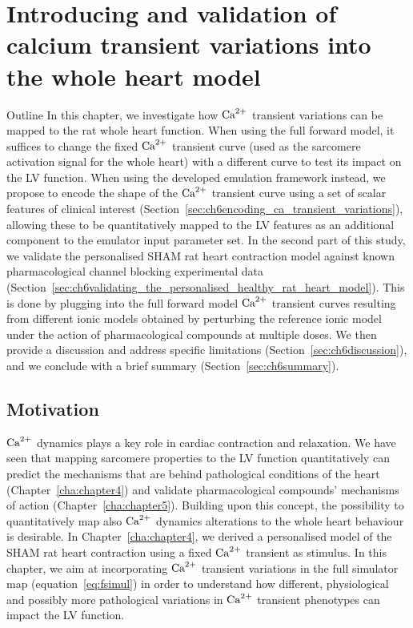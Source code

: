 \chapter{Introducing and validation of calcium transient variations into the whole heart model}\label{cha:chapter6}
%
%
%
\begin{remark}{Outline}
    In this chapter, we investigate how $\textrm{Ca}^{2+}$ transient variations can be mapped to the rat whole heart function. When using the full forward model, it suffices to change the fixed $\textrm{Ca}^{2+}$ transient curve (used as the sarcomere activation signal for the whole heart) with a different curve to test its impact on the LV function. When using the developed emulation framework instead, we propose to encode the shape of the $\textrm{Ca}^{2+}$ transient curve using a set of scalar features of clinical interest (Section~\ref{sec:ch6encoding_ca_transient_variations}), allowing these to be quantitatively mapped to the LV features as an additional component to the emulator input parameter set. In the second part of this study, we validate the personalised SHAM rat heart contraction model against known pharmacological channel blocking experimental data (Section~\ref{sec:ch6validating_the_personalised_healthy_rat_heart_model}). This is done by plugging into the full forward model $\textrm{Ca}^{2+}$ transient curves resulting from different ionic models obtained by perturbing the reference ionic model under the action of pharmacological compounds at multiple doses. We then provide a discussion and address specific limitations (Section~\ref{sec:ch6discussion}), and we conclude with a brief summary (Section~\ref{sec:ch6summary}).
\end{remark}


%
%
%
\section{Motivation}\label{sec:ch6motivation}
$\textrm{Ca}^{2+}$ dynamics plays a key role in cardiac contraction and relaxation. We have seen that mapping sarcomere properties to the LV function quantitatively can predict the mechanisms that are behind pathological conditions of the heart (Chapter~\ref{cha:chapter4}) and validate pharmacological compounds' mechanisms of action (Chapter~\ref{cha:chapter5}). Building upon this concept, the possibility to quantitatively map also $\textrm{Ca}^{2+}$ dynamics alterations to the whole heart behaviour is desirable. In Chapter~\ref{cha:chapter4}, we derived a personalised model of the SHAM rat heart contraction using a fixed $\textrm{Ca}^{2+}$ transient as stimulus. In this chapter, we aim at incorporating $\textrm{Ca}^{2+}$ transient variations in the full simulator map (equation~\ref{eq:fsimul}) in order to understand how different, physiological and possibly more pathological variations in $\textrm{Ca}^{2+}$ transient phenotypes can impact the LV function.


